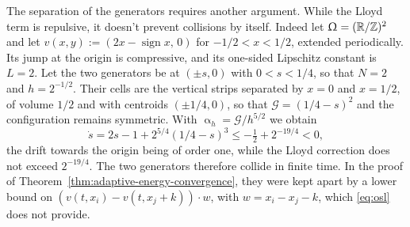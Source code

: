 \documentclass[letterpaper,11pt,twoside]{article}
\numberwithin{figure}{section}
\numberwithin{table}{section}
\theoremstyle{cpamplain}
\theoremstyle{cpamdefinition}
\newcommand{\R}{\mathbb{R}}
\let\alpha\upalpha
\let\Omega\Upomega
\renewcommand{\le}{\leqslant}
\numberwithin{equation}{section}
\begin{document}
The separation of the generators requires another argument.
While the Lloyd term is repulsive, it doesn't prevent collisions by itself. Indeed let $\Omega=(\R/\mathbb Z)^2$ and let $v(x,y):=\left(2x-\operatorname{sign}x,\,0\right)$ for $-1/2<x<1/2$, extended periodically.
Its jump at the origin is compressive, and its one-sided Lipschitz constant is $L=2$.
Let the two generators be at $(\pm s,0)$ with $0<s<1/4$, so that $N=2$ and $h=2^{-1/2}$.
Their cells are the vertical strips separated by $x=0$ and $x=1/2$, of volume $1/2$ and with centroids $(\pm1/4,0)$, so that $\mathscr G=(1/4-s)^2$ and the configuration remains symmetric.
With $\alpha_h=\mathscr G/h^{5/2}$ we obtain
\[
\dot s=2s-1+2^{5/4}\left(1/4-s\right)^3\le-\tfrac12+2^{-19/4}<0 ,
\]
the drift towards the origin being of order one, while the Lloyd correction does not exceed $2^{-19/4}$.
The two generators therefore collide in finite time.
In the proof of Theorem~\ref{thm:adaptive-energy-convergence}, they were kept apart by a lower bound on $\left(v(t,x_i)-v(t,x_j+k)\right)\cdot w$, with $w=x_i-x_j-k$, which \eqref{eq:osl} does not provide.
\end{document}
